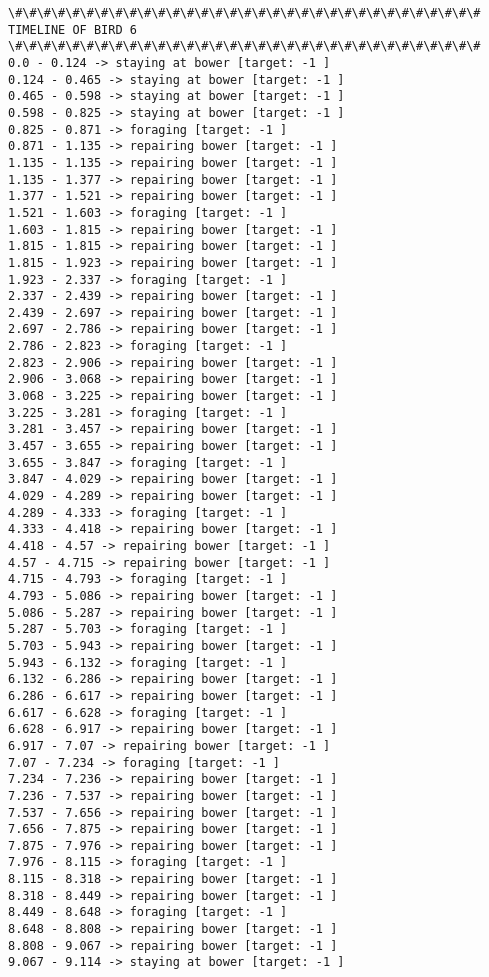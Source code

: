 \documentclass[11pt]{article}
\begin{document}
\begin{Verbatim}[commandchars=\\\{\}]
\#\#\#\#\#\#\#\#\#\#\#\#\#\#\#\#\#\#\#\#\#\#\#\#\#\#\#\#\#\#\#\#\#
TIMELINE OF BIRD 6
\#\#\#\#\#\#\#\#\#\#\#\#\#\#\#\#\#\#\#\#\#\#\#\#\#\#\#\#\#\#\#\#\#
0.0 - 0.124 -> staying at bower [target: -1 ]
0.124 - 0.465 -> staying at bower [target: -1 ]
0.465 - 0.598 -> staying at bower [target: -1 ]
0.598 - 0.825 -> staying at bower [target: -1 ]
0.825 - 0.871 -> foraging [target: -1 ]
0.871 - 1.135 -> repairing bower [target: -1 ]
1.135 - 1.135 -> repairing bower [target: -1 ]
1.135 - 1.377 -> repairing bower [target: -1 ]
1.377 - 1.521 -> repairing bower [target: -1 ]
1.521 - 1.603 -> foraging [target: -1 ]
1.603 - 1.815 -> repairing bower [target: -1 ]
1.815 - 1.815 -> repairing bower [target: -1 ]
1.815 - 1.923 -> repairing bower [target: -1 ]
1.923 - 2.337 -> foraging [target: -1 ]
2.337 - 2.439 -> repairing bower [target: -1 ]
2.439 - 2.697 -> repairing bower [target: -1 ]
2.697 - 2.786 -> repairing bower [target: -1 ]
2.786 - 2.823 -> foraging [target: -1 ]
2.823 - 2.906 -> repairing bower [target: -1 ]
2.906 - 3.068 -> repairing bower [target: -1 ]
3.068 - 3.225 -> repairing bower [target: -1 ]
3.225 - 3.281 -> foraging [target: -1 ]
3.281 - 3.457 -> repairing bower [target: -1 ]
3.457 - 3.655 -> repairing bower [target: -1 ]
3.655 - 3.847 -> foraging [target: -1 ]
3.847 - 4.029 -> repairing bower [target: -1 ]
4.029 - 4.289 -> repairing bower [target: -1 ]
4.289 - 4.333 -> foraging [target: -1 ]
4.333 - 4.418 -> repairing bower [target: -1 ]
4.418 - 4.57 -> repairing bower [target: -1 ]
4.57 - 4.715 -> repairing bower [target: -1 ]
4.715 - 4.793 -> foraging [target: -1 ]
4.793 - 5.086 -> repairing bower [target: -1 ]
5.086 - 5.287 -> repairing bower [target: -1 ]
5.287 - 5.703 -> foraging [target: -1 ]
5.703 - 5.943 -> repairing bower [target: -1 ]
5.943 - 6.132 -> foraging [target: -1 ]
6.132 - 6.286 -> repairing bower [target: -1 ]
6.286 - 6.617 -> repairing bower [target: -1 ]
6.617 - 6.628 -> foraging [target: -1 ]
6.628 - 6.917 -> repairing bower [target: -1 ]
6.917 - 7.07 -> repairing bower [target: -1 ]
7.07 - 7.234 -> foraging [target: -1 ]
7.234 - 7.236 -> repairing bower [target: -1 ]
7.236 - 7.537 -> repairing bower [target: -1 ]
7.537 - 7.656 -> repairing bower [target: -1 ]
7.656 - 7.875 -> repairing bower [target: -1 ]
7.875 - 7.976 -> repairing bower [target: -1 ]
7.976 - 8.115 -> foraging [target: -1 ]
8.115 - 8.318 -> repairing bower [target: -1 ]
8.318 - 8.449 -> repairing bower [target: -1 ]
8.449 - 8.648 -> foraging [target: -1 ]
8.648 - 8.808 -> repairing bower [target: -1 ]
8.808 - 9.067 -> repairing bower [target: -1 ]
9.067 - 9.114 -> staying at bower [target: -1 ]

\end{Verbatim}
\end{document}
